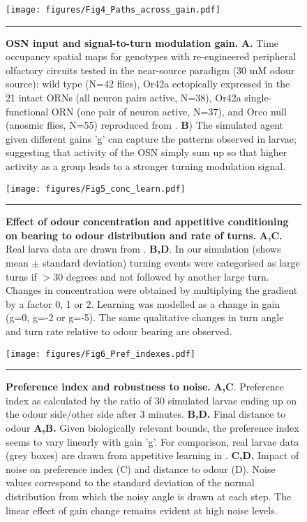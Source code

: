 \documentclass[11pt,a4paper]{article}
\newcommand{\todoBW}[1]{\todo[author=BW,color=orange, size=\tiny,inline]{1}}
\begin{document}
\begin{figure}
\begin{center}
\texttt{[image: figures/Fig4\_Paths\_across\_gain.pdf]}
\caption{{\bf OSN input and signal-to-turn modulation gain.}
{\bf A.} Time occupancy spatial maps for genotypes with re-engineered peripheral olfactory circuits tested in the near-source paradigm (30 mM odour source): wild type (N=42 flies), Or42a ectopically expressed in the 21 intact ORNs (all neuron pairs active, N=38), Or42a single-functional ORN (one pair of neuron active, N=37), and Orco null (anosmic flies, N=55) reproduced from \cite{gomez2011active}.
{\bf B}) The simulated agent given different gains 'g' can capture the patterns observed in larvae; suggesting that activity of the OSN simply sum up so that higher activity as a group leads to a stronger turning modulation signal.
\label{fig:OSN}}
\hrule
\end{center}
\end{figure}


\begin{figure}
\begin{center}
\texttt{[image: figures/Fig5\_conc\_learn.pdf]}
\caption{{\bf Effect of odour concentration and appetitive conditioning on bearing to odour distribution and rate of turns.} {\bf A,C.} Real larva data are drawn from \citep{schleyer2015learning}. {\bf B,D}. In our simulation (shows mean $\pm$ standard deviation) turning events were categorised as large turns if $>30$ degrees and not followed by another large turn. Changes in concentration were obtained by multiplying the gradient by a factor 0, 1 or 2. Learning was modelled as a change in gain (g=0, g=-2 or g=-5). The same qualitative changes in turn angle and turn rate relative to odour bearing are observed.
\label{fig:Concentration}}
\hrule
\end{center}
\end{figure}

\begin{figure}
\begin{center}
\texttt{[image: figures/Fig6\_Pref\_indexes.pdf]}
\caption{{\bf Preference index and robustness to noise. }
{\bf A,C}. Preference index as calculated by the ratio of 30 simulated larvae ending up on the odour side/other side after 3 minutes. {\bf B,D.} Final distance to odour 
{\bf A,B.} Given biologically relevant bounds, the preference index seems to vary linearly with  gain 'g'. For comparison, real larvae data (grey boxes) are drawn from appetitive learning in \citep{schleyer2011behavior}.
{\bf C,D.} Impact of noise on preference index (C) and distance to odour (D). Noise values correspond to the standard deviation of the normal distribution from which the noisy angle is drawn at each step. The linear effect of gain change remains evident at high noise levels.
\todoBW{Could consider removing B,D; they don't add much information}
\label{fig:PreferenceIndex}}
\hrule
\end{center}
\end{figure}
\end{document}
